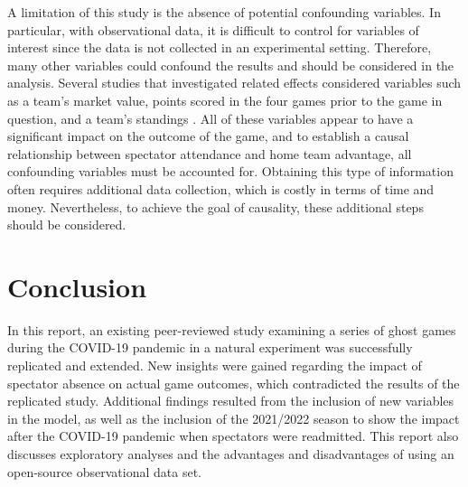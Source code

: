 A limitation of this study is the absence of potential confounding variables. In particular, with observational data, it is difficult to control for variables of interest since the data is not collected in an experimental setting. Therefore, many other variables could confound the results and should be considered in the analysis. Several studies that investigated related effects considered variables such as a team's market value, points scored in the four games prior to the game in question, and a team's standings \cite{mccarrick2021home,cross2020fans,ponzo2018does,jimenez2021home}. All of these variables appear to have a significant impact on the outcome of the game, and to establish a causal relationship between spectator attendance and home team advantage, all confounding variables must be accounted for. Obtaining this type of information often requires additional data collection, which is costly in terms of time and money. Nevertheless, to achieve the goal of causality, these additional steps should be considered.

\section{Conclusion}
In this report, an existing peer-reviewed study examining a series of ghost games during the COVID-19 pandemic in a natural experiment was successfully replicated and extended. New insights were gained regarding the impact of spectator absence on actual game outcomes, which contradicted the results of the replicated study. Additional findings resulted from the inclusion of new variables in the model, as well as the inclusion of the 2021/2022 season to show the impact after the COVID-19 pandemic when spectators were readmitted. This report also discusses exploratory analyses and the advantages and disadvantages of using an open-source observational data set. 

